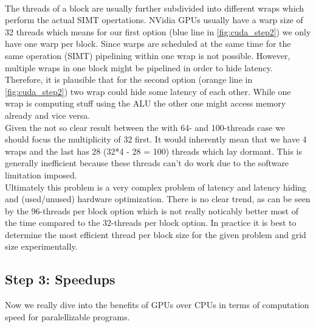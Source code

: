 \\
The threads of a block are usually further subdivided into different wraps which perform the actual SIMT opertations. NVidia GPUs usually have a warp size of 32 threads which means for our first option (blue line in \autoref{fig:cuda_step2}) we only have one warp per block. Since warps are scheduled at the same time for the same operation (SIMT) pipelining within one wrap is not possible. However, multiple wraps in one block might be pipelined in order to hide latency. Therefore, it is plausible that for the second option (orange line in \autoref{fig:cuda_step2}) two wrap could hide some latency of each other. While one wrap is computing stuff using the ALU the other one might access memory already and vice versa. \\
Given the not so clear result between the with 64- and 100-threads case we should focus the multiplicity of 32 first. It would inherently mean that we have 4 wraps and the last has 28 (32*4 - 28 = 100) threads which lay dormant. This is generally inefficient because these threads can't do work due to the software limitation imposed.\\
Ultimately this problem is a very complex problem of latency and latency hiding and (used/unused) hardware optimization. There is no clear trend, as can be seen by the 96-threads per block option which is not really noticably better most of the time compared to the 32-threads per block option. In practice it is best to determine the most efficient thread per block size for the given problem and grid size experimentally. 


\subsection{Step 3: Speedups}
Now we really dive into the benefits of GPUs over CPUs in terms of computation speed for paralellizable programs. \\

